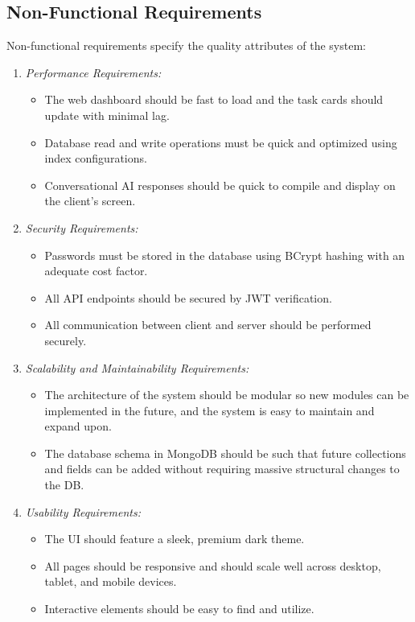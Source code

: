 \documentclass[conference]{IEEEtran}
\begin{document}
\subsection{Non-Functional Requirements}
Non-functional requirements specify the quality attributes of the system:
\begin{enumerate}
    \item \textit{Performance Requirements:}
    \begin{itemize}
        \item The web dashboard should be fast to load and the task cards should update with minimal lag.
        \item Database read and write operations must be quick and optimized using index configurations.
        \item Conversational AI responses should be quick to compile and display on the client's screen.
    \end{itemize}
    \item \textit{Security Requirements:}
    \begin{itemize}
        \item Passwords must be stored in the database using BCrypt hashing with an adequate cost factor.
        \item All API endpoints should be secured by JWT verification.
        \item All communication between client and server should be performed securely.
    \end{itemize}
    \item \textit{Scalability and Maintainability Requirements:}
    \begin{itemize}
        \item The architecture of the system should be modular so new modules can be implemented in the future, and the system is easy to maintain and expand upon.
        \item The database schema in MongoDB should be such that future collections and fields can be added without requiring massive structural changes to the DB.
    \end{itemize}
    \item \textit{Usability Requirements:}
    \begin{itemize}
        \item The UI should feature a sleek, premium dark theme.
        \item All pages should be responsive and should scale well across desktop, tablet, and mobile devices.
        \item Interactive elements should be easy to find and utilize.
    \end{itemize}
\end{enumerate}
\end{document}

